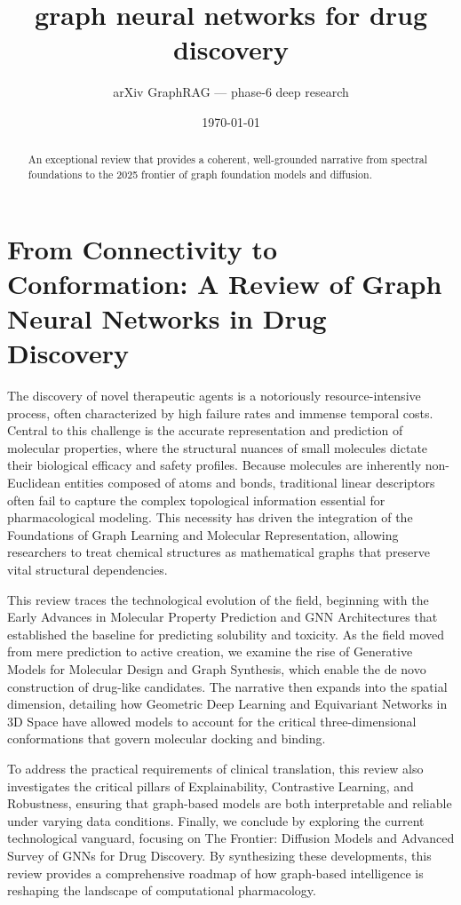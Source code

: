 \documentclass[11pt]{article}
\title{graph neural networks for drug discovery}
\author{arXiv GraphRAG --- phase-6 deep research}
\date{\today}
\begin{document}
\maketitle

\begin{abstract}
An exceptional review that provides a coherent, well-grounded narrative from spectral foundations to the 2025 frontier of graph foundation models and diffusion.
\end{abstract}

\section{From Connectivity to Conformation: A Review of Graph Neural Networks in Drug Discovery}

The discovery of novel therapeutic agents is a notoriously resource-intensive process, often characterized by high failure rates and immense temporal costs. Central to this challenge is the accurate representation and prediction of molecular properties, where the structural nuances of small molecules dictate their biological efficacy and safety profiles. Because molecules are inherently non-Euclidean entities composed of atoms and bonds, traditional linear descriptors often fail to capture the complex topological information essential for pharmacological modeling. This necessity has driven the integration of the Foundations of Graph Learning and Molecular Representation, allowing researchers to treat chemical structures as mathematical graphs that preserve vital structural dependencies.

This review traces the technological evolution of the field, beginning with the Early Advances in Molecular Property Prediction and GNN Architectures that established the baseline for predicting solubility and toxicity. As the field moved from mere prediction to active creation, we examine the rise of Generative Models for Molecular Design and Graph Synthesis, which enable the de novo construction of drug-like candidates. The narrative then expands into the spatial dimension, detailing how Geometric Deep Learning and Equivariant Networks in 3D Space have allowed models to account for the critical three-dimensional conformations that govern molecular docking and binding.

To address the practical requirements of clinical translation, this review also investigates the critical pillars of Explainability, Contrastive Learning, and Robustness, ensuring that graph-based models are both interpretable and reliable under varying data conditions. Finally, we conclude by exploring the current technological vanguard, focusing on The Frontier: Diffusion Models and Advanced Survey of GNNs for Drug Discovery. By synthesizing these developments, this review provides a comprehensive roadmap of how graph-based intelligence is reshaping the landscape of computational pharmacology.
\end{document}
